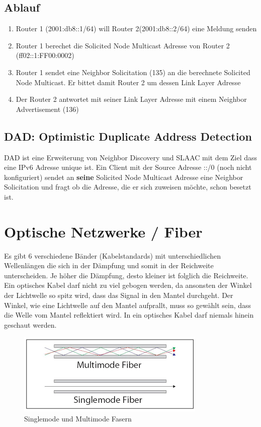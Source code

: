\subsection{Ablauf}
\begin{enumerate}
	\item Router 1 (2001:db8::1/64) will Router 2(2001:db8::2/64) eine Meldung senden
	\item Router 1 berechet die Solicited Node Multicast Adresse von Router 2 (ff02::1:FF00:0002)
	\item Router 1 sendet eine Neighbor Solicitation (135) an die berechnete Solicited Node Multicast. Er bittet damit Router 2 um dessen Link Layer Adresse
	\item Der Router 2 antwortet mit seiner Link Layer Adresse mit einem Neighbor Advertisement (136)
\end{enumerate}


\subsection{DAD: Optimistic Duplicate Address Detection}
DAD ist eine Erweiterung von Neighbor Discovery und SLAAC mit dem Ziel dass eine IPv6 Adresse unique ist. Ein Client mit der Source Adresse ::/0 (noch nicht konfiguriert) sendet an \textbf{seine} Solicited Node Multicast Adresse eine Neighbor Solicitation und fragt ob die Adresse, die er sich zuweisen möchte, schon besetzt ist.

\section{Optische Netzwerke / Fiber}
Es gibt 6 verschiedene Bänder (Kabelstandards) mit unterschiedlichen Wellenlängen die sich in der Dämpfung und somit in der Reichweite unterscheiden. Je höher die Dämpfung, desto kleiner ist folglich die Reichweite. Ein optisches Kabel darf nicht zu viel gebogen werden, da ansonsten der Winkel der Lichtwelle so spitz wird, dass das Signal in den Mantel durchgeht. Der Winkel, wie eine Lichtwelle auf den Mantel aufprallt, muss so gewählt sein, dass die Welle vom Mantel reflektiert wird. In ein optisches Kabel darf niemals hinein geschaut werden.

\begin{figure}[h]
\centering
\includegraphics[width=0.4\linewidth]{images/singlemode_multimode}
\caption{Singlemode und Multimode Fasern}
\end{figure}

